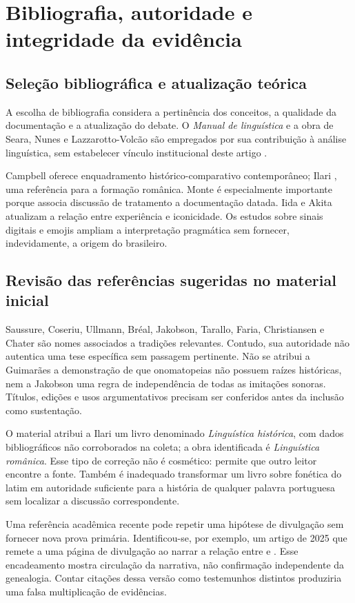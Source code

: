 \section{Bibliografia, autoridade e integridade da evidência}
\subsection{Seleção bibliográfica e atualização teórica}
A escolha de bibliografia considera a pertinência dos conceitos, a qualidade da documentação e a atualização do debate. O \textit{Manual de linguística} e a obra de Seara, Nunes e Lazzarotto-Volcão são empregados por sua contribuição à análise linguística, sem estabelecer vínculo institucional deste artigo \cite{martelotta2008,seara2015}.

Campbell \cite{campbell2021} oferece enquadramento histórico-comparativo contemporâneo; Ilari \cite{ilari2018}, uma referência para a formação românica. Monte \cite{monte2019} é especialmente importante porque associa discussão de tratamento a documentação datada. Iida e Akita \cite{iida2024} atualizam a relação entre experiência e iconicidade. Os estudos sobre sinais digitais e emojis ampliam a interpretação pragmática sem fornecer, indevidamente, a origem do  brasileiro.

\subsection{Revisão das referências sugeridas no material inicial}
Saussure, Coseriu, Ullmann, Bréal, Jakobson, Tarallo, Faria, Christiansen e Chater são nomes associados a tradições relevantes. Contudo, sua autoridade não autentica uma tese específica sem passagem pertinente. Não se atribui a Guimarães a demonstração de que onomatopeias não possuem raízes históricas, nem a Jakobson uma regra de independência de todas as imitações sonoras. Títulos, edições e usos argumentativos precisam ser conferidos antes da inclusão como sustentação.

O material atribui a Ilari um livro denominado \textit{Linguística histórica}, com dados bibliográficos não corroborados na coleta; a obra identificada é \textit{Linguística românica}. Esse tipo de correção não é cosmético: permite que outro leitor encontre a fonte. Também é inadequado transformar um livro sobre fonética do latim em autoridade suficiente para a história de qualquer palavra portuguesa sem localizar a discussão correspondente.

Uma referência acadêmica recente pode repetir uma hipótese de divulgação sem fornecer nova prova primária. Identificou-se, por exemplo, um artigo de 2025 que remete a uma página de divulgação ao narrar a relação entre  e . Esse encadeamento mostra circulação da narrativa, não confirmação independente da genealogia. Contar citações dessa versão como testemunhos distintos produziria uma falsa multiplicação de evidências.

